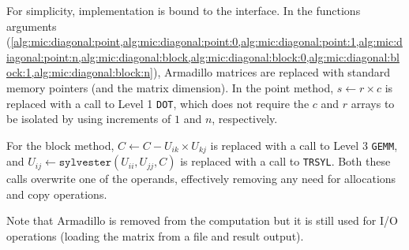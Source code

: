 \documentclass[../thesis]{subfiles}
\begin{document}
	For simplicity, implementation is bound to the \intel\mkl\blas interface. In the functions arguments (\cref{alg:mic:diagonal:point,alg:mic:diagonal:point:0,alg:mic:diagonal:point:1,alg:mic:diagonal:point:n,alg:mic:diagonal:block,alg:mic:diagonal:block:0,alg:mic:diagonal:block:1,alg:mic:diagonal:block:n}), Armadillo matrices are replaced with standard memory pointers (and the matrix dimension). In the point method, $s \leftarrow r \times c$ is replaced with a call to Level 1 \blas\texttt{DOT}, which does not require the $c$ and $r$ arrays to be isolated by using increments of $1$ and $n$, respectively.

	For the block method, $C \leftarrow C - U_{ik} \times U_{kj}$ is replaced with a call to Level 3 \blas\texttt{GEMM}, and $U_{ij} \leftarrow \mathtt{sylvester} \left( U_{ii}, U_{jj}, C\right)$ is replaced with a call to \lapack\texttt{TRSYL}. Both these calls overwrite one of the operands, effectively removing any need for allocations and copy operations.

	Note that Armadillo is removed from the computation but it is still used for I/O operations (loading the matrix from a file and result output).
\end{document}
